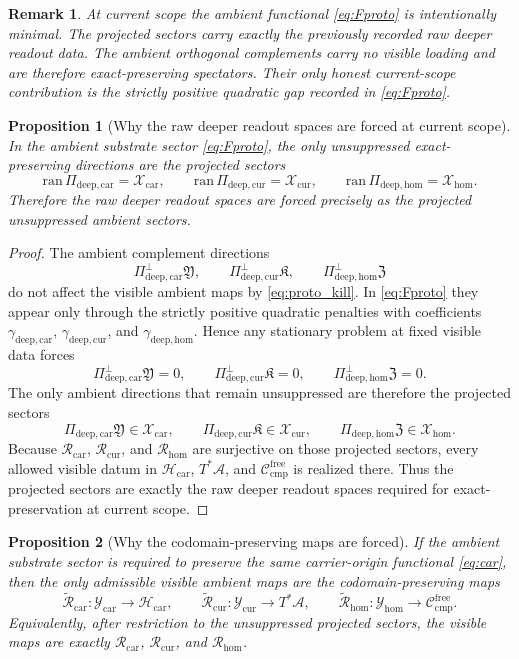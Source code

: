 \documentclass[11pt]{article}
\newcommand{\Sub}{\mathcal A}
\newcommand{\CompFree}{\mathscr C_{\mathrm{cmp}}^{\mathrm{free}}}
\newcommand{\CarrierClass}{\mathscr H_{\mathrm{car}}}
\newcommand{\DeepTensorClass}{\mathscr X_{\mathrm{car}}}
\newcommand{\DeepRelabelClass}{\mathscr X_{\mathrm{cur}}}
\newcommand{\DeepFreeClass}{\mathscr X_{\mathrm{hom}}}
\newcommand{\CarRead}{\mathcal R_{\mathrm{car}}}
\newcommand{\CurRead}{\mathcal R_{\mathrm{cur}}}
\newcommand{\HomRead}{\mathcal R_{\mathrm{hom}}}
\newcommand{\ProtoTensorClass}{\mathscr Y_{\mathrm{car}}}
\newcommand{\ProtoRelabelClass}{\mathscr Y_{\mathrm{cur}}}
\newcommand{\ProtoFreeClass}{\mathscr Y_{\mathrm{hom}}}
\newcommand{\ProtoTensor}{\mathfrak Y}
\newcommand{\ProtoRelabel}{\mathfrak K}
\newcommand{\ProtoFree}{\mathfrak Z}
\newcommand{\ProtoCarProj}{\Pi_{\mathrm{deep,car}}}
\newcommand{\ProtoCurProj}{\Pi_{\mathrm{deep,cur}}}
\newcommand{\ProtoHomProj}{\Pi_{\mathrm{deep,hom}}}
\newcommand{\ProtoCarPerp}{\Pi_{\mathrm{deep,car}}^{\perp}}
\newcommand{\ProtoCurPerp}{\Pi_{\mathrm{deep,cur}}^{\perp}}
\newcommand{\ProtoHomPerp}{\Pi_{\mathrm{deep,hom}}^{\perp}}
\newcommand{\ProtoCarRead}{\widetilde{\mathcal R}_{\mathrm{car}}}
\newcommand{\ProtoCurRead}{\widetilde{\mathcal R}_{\mathrm{cur}}}
\newcommand{\ProtoHomRead}{\widetilde{\mathcal R}_{\mathrm{hom}}}
\newcommand{\ProtoCarGap}{\gamma_{\mathrm{deep,car}}}
\newcommand{\ProtoCurGap}{\gamma_{\mathrm{deep,cur}}}
\newcommand{\ProtoHomGap}{\gamma_{\mathrm{deep,hom}}}
\newtheorem{proposition}{Proposition}
\newtheorem{remark}{Remark}
\begin{document}
\begin{remark}
At current scope the ambient functional \eqref{eq:Fproto} is intentionally minimal. The projected sectors carry exactly the previously recorded raw deeper readout data. The ambient orthogonal complements carry no visible loading and are therefore exact-preserving spectators. Their only honest current-scope contribution is the strictly positive quadratic gap recorded in \eqref{eq:Fproto}.
\end{remark}

\begin{proposition}[Why the raw deeper readout spaces are forced at current scope]
\label{prop:rawforced}
In the ambient substrate sector \eqref{eq:Fproto}, the only unsuppressed exact-preserving directions are the projected sectors
\[
\mathrm{ran}\,\ProtoCarProj=\DeepTensorClass,
\qquad
\mathrm{ran}\,\ProtoCurProj=\DeepRelabelClass,
\qquad
\mathrm{ran}\,\ProtoHomProj=\DeepFreeClass.
\]
Therefore the raw deeper readout spaces are forced precisely as the projected unsuppressed ambient sectors.
\end{proposition}

\begin{proof}
The ambient complement directions
\[
\ProtoCarPerp\ProtoTensor,\qquad
\ProtoCurPerp\ProtoRelabel,\qquad
\ProtoHomPerp\ProtoFree
\]
do not affect the visible ambient maps by \eqref{eq:proto_kill}. In \eqref{eq:Fproto} they appear only through the strictly positive quadratic penalties with coefficients \(\ProtoCarGap\), \(\ProtoCurGap\), and \(\ProtoHomGap\). Hence any stationary problem at fixed visible data forces
\[
\ProtoCarPerp\ProtoTensor=0,
\qquad
\ProtoCurPerp\ProtoRelabel=0,
\qquad
\ProtoHomPerp\ProtoFree=0.
\]
The only ambient directions that remain unsuppressed are therefore the projected sectors
\[
\ProtoCarProj\ProtoTensor\in\DeepTensorClass,\qquad
\ProtoCurProj\ProtoRelabel\in\DeepRelabelClass,\qquad
\ProtoHomProj\ProtoFree\in\DeepFreeClass.
\]
Because \(\CarRead\), \(\CurRead\), and \(\HomRead\) are surjective on those projected sectors, every allowed visible datum in \(\CarrierClass\), \(T^*\Sub\), and \(\CompFree\) is realized there. Thus the projected sectors are exactly the raw deeper readout spaces required for exact-preservation at current scope.
\end{proof}

\begin{proposition}[Why the codomain-preserving maps are forced]
\label{prop:proto_codomains}
If the ambient substrate sector is required to preserve the same carrier-origin functional \eqref{eq:car}, then the only admissible visible ambient maps are the codomain-preserving maps
\[
\ProtoCarRead:\ProtoTensorClass\to\CarrierClass,
\qquad
\ProtoCurRead:\ProtoRelabelClass\to T^*\Sub,
\qquad
\ProtoHomRead:\ProtoFreeClass\to\CompFree.
\]
Equivalently, after restriction to the unsuppressed projected sectors, the visible maps are exactly \(\CarRead\), \(\CurRead\), and \(\HomRead\).
\end{proposition}
\end{document}
